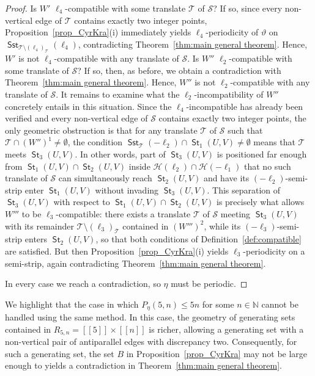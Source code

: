 \documentclass[12pt]{amsart}
\numberwithin{equation}{section}
\DeclareMathOperator{\st}{\mathsf{St}}
\DeclareMathOperator{\sst}{\mathsf{Sst}}
\newcommand{\llb}{[\![}
\newcommand{\rrb}{]\!]}
\begin{document}
\begin{proof}
Is $W'$ $\pmb{\ell}_4$-compatible with some translate $\mathcal{T}$ of $\mathcal{S}$? If so, since every non-vertical edge of $\mathcal{T}$ contains exactly two integer points, Proposition~\ref{prop_CyrKra}(i) immediately yields $\ell_4$-periodicity of $\vartheta$ on $\sst_{\mathcal{T}\setminus (\pmb{\ell}_4)_{\mathcal{T}}}(\pmb{\ell}_4)$, contradicting Theorem~\ref{thm:main general theorem}.
Hence, $W'$ is not $\pmb{\ell}_4$-compatible with any translate of $\mathcal{S}$. Is $W''$ $\pmb{\ell}_2$-compatible with some translate of $\mathcal{S}$? If so, then, as before, we obtain a contradiction with Theorem~\ref{thm:main general theorem}. Hence, $W''$ is not $\pmb{\ell}_2$-compatible with any translate of $\mathcal{S}$.
It remains to examine what the $\pmb{\ell}_2$-incompatibility of $W''$ concretely entails in this situation. 
Since the $\pmb{\ell}_4$-incompatible has already been verified and every non-vertical edge of $\mathcal{S}$ contains exactly two integer points, the only geometric obstruction is that for any translate $\mathcal{T}$ of $\mathcal{S}$ such that %
$\mathcal{T} \cap (W'')^1 \neq \emptyset $, the condition $\sst_{\mathcal{T}}(-\pmb{\ell}_2) \cap \st_1(U,V) \neq \emptyset$ means that $\mathcal{T}$ meets $\st_3(U,V)$. 
In other words, part of $\st_3(U,V)$ is positioned far enough from $\st_1(U,V) \cap \st_2(U,V) $ inside $ \mathcal H(\pmb{\ell}_2) \cap \mathcal H(-\pmb{\ell}_1) $ that no such translate of $\mathcal{S}$ can simultaneously reach $\st_2(U,V)$ and have its $(-\pmb{\ell}_2)$-semi-strip enter $\st_1(U,V)$ without invading $\st_3(U,V)$.
This separation of $\st_3(U,V)$ with respect to $\st_1(U,V) \cap \st_2(U,V) $ is precisely what allows
$W'''$ to be $\pmb{\ell}_3$-compatible: there exists a translate $\mathcal{T}$ of $\mathcal{S}$ meeting $\st_3(U,V)$ with its remainder $\mathcal{T}\setminus(\pmb{\ell}_3)_{\mathcal{T}}$ contained in $(W''')^2$,
while its $(-\pmb{\ell}_3)$-semi-strip enters $\st_2(U,V)$, so that both
conditions of Definition~\ref{def:compatible} are satisfied.
But then Proposition~\ref{prop_CyrKra}(i) yields $\ell_3$-periodicity on a semi-strip, again contradicting Theorem~\ref{thm:main general theorem}.

In every case we reach a contradiction, so $\eta$ must be periodic.
\end{proof}

We highlight that the case in which \(P_{\eta}(5,n) \leq 5n\) for some \(n \in \mathbb{N}\) cannot be handled using the same method. In this case, the geometry of generating sets contained in \(R_{5,n} = \llb 5 \rrb \times \llb n \rrb\) is richer, allowing a generating set with a non-vertical pair of antiparallel edges with discrepancy two. Consequently, for such a generating set, the set \(B\) in Proposition~\ref{prop_CyrKra} may not be large enough to yields a contradiction in Theorem~\ref{thm:main general theorem}.
\end{document}
